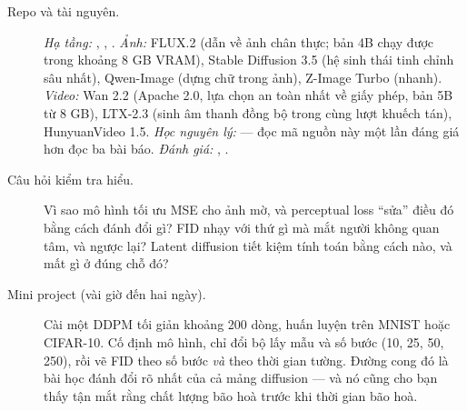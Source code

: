 \documentclass[../../deep_learning.tex]{subfiles}
\begin{document}
\begin{description}
\item[Repo và tài nguyên.] \emph{Hạ tầng:} , , . \emph{Ảnh:} FLUX.2 (dẫn về ảnh chân thực; bản  4B chạy được trong khoảng 8 GB VRAM), Stable Diffusion 3.5 (hệ sinh thái tinh chỉnh sâu nhất), Qwen-Image (dựng chữ trong ảnh), Z-Image Turbo (nhanh). \emph{Video:} Wan 2.2 (Apache 2.0, lựa chọn an toàn nhất về giấy phép, bản 5B từ 8 GB), LTX-2.3 (sinh âm thanh đồng bộ trong cùng lượt khuếch tán), HunyuanVideo 1.5. \emph{Học nguyên lý:}  --- đọc mã nguồn này một lần đáng giá hơn đọc ba bài báo. \emph{Đánh giá:} , .
\item[Câu hỏi kiểm tra hiểu.] Vì sao mô hình tối ưu MSE cho ảnh mờ, và perceptual loss ``sửa'' điều đó bằng cách đánh đổi gì? FID nhạy với thứ gì mà mắt người không quan tâm, và ngược lại? Latent diffusion tiết kiệm tính toán bằng cách nào, và mất gì ở đúng chỗ đó?
\item[Mini project (vài giờ đến hai ngày).] Cài một DDPM tối giản khoảng 200 dòng, huấn luyện trên MNIST hoặc CIFAR-10. Cố định mô hình, chỉ đổi bộ lấy mẫu và số bước (10, 25, 50, 250), rồi vẽ FID theo số bước \emph{và} theo thời gian tường. Đường cong đó là bài học đánh đổi rõ nhất của cả mảng diffusion --- và nó cũng cho bạn thấy tận mắt rằng chất lượng bão hoà trước khi thời gian bão hoà.
\end{description}
\end{document}
